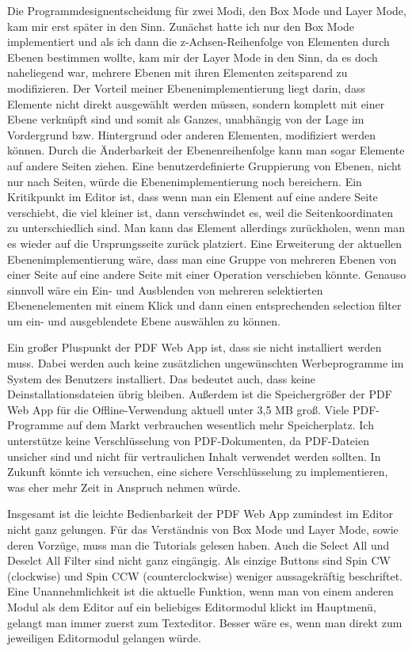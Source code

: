 \par
Die Programmdesignentscheidung für zwei Modi, den Box Mode und Layer Mode, kam mir erst später in den Sinn. Zunächst hatte ich nur den Box Mode implementiert und als ich dann die z-Achsen-Reihenfolge von Elementen durch Ebenen bestimmen wollte, kam mir der Layer Mode in den Sinn, da es doch naheliegend war, mehrere Ebenen mit ihren Elementen zeitsparend zu modifizieren. Der Vorteil meiner Ebenenimplementierung liegt darin, dass Elemente nicht direkt ausgewählt werden müssen, sondern komplett mit einer Ebene verknüpft sind und somit als Ganzes, unabhängig von der Lage im Vordergrund bzw. Hintergrund oder anderen Elementen, modifiziert werden können. Durch die Änderbarkeit der Ebenenreihenfolge kann man sogar Elemente auf andere Seiten ziehen. Eine benutzerdefinierte Gruppierung von Ebenen, nicht nur nach Seiten, würde die Ebenenimplementierung noch bereichern. Ein Kritikpunkt im Editor ist, dass wenn man ein Element auf eine andere Seite verschiebt, die viel kleiner ist, dann verschwindet es, weil die Seitenkoordinaten zu unterschiedlich sind. Man kann das Element allerdings zurückholen, wenn man es wieder auf die Ursprungsseite zurück platziert. Eine Erweiterung der aktuellen Ebenenimplementierung wäre, dass man eine Gruppe von mehreren Ebenen von einer Seite auf eine andere Seite mit einer Operation verschieben könnte. Genauso sinnvoll wäre ein Ein- und Ausblenden von mehreren selektierten Ebenenelementen mit einem Klick und dann einen entsprechenden selection filter um ein- und ausgeblendete Ebene auswählen zu können. 
\par   
Ein großer Pluspunkt der PDF Web App ist, dass sie nicht installiert werden muss. Dabei werden auch keine zusätzlichen ungewünschten Werbeprogramme im System des Benutzers installiert. Das bedeutet auch, dass keine Deinstallationsdateien übrig bleiben. Außerdem ist die Speichergrößer der PDF Web App für die Offline-Verwendung aktuell unter 3,5 MB groß. Viele PDF-Programme auf dem Markt verbrauchen wesentlich mehr Speicherplatz. Ich unterstütze keine Verschlüsselung von PDF-Dokumenten, da PDF-Dateien unsicher sind und nicht für vertraulichen Inhalt verwendet werden sollten. In Zukunft könnte ich versuchen, eine sichere Verschlüsselung zu implementieren, was eher mehr Zeit in Anspruch nehmen würde.
\par
Insgesamt ist die leichte Bedienbarkeit der PDF Web App zumindest im Editor nicht ganz gelungen. Für das Verständnis von Box Mode und Layer Mode, sowie deren Vorzüge, muss man die Tutorials gelesen haben. Auch die Select All und Deselct All Filter sind nicht ganz eingängig. Als einzige Buttons sind Spin CW (clockwise) und Spin CCW (counterclockwise) weniger aussagekräftig beschriftet. Eine Unannehmlichkeit ist die aktuelle Funktion, wenn man von einem anderen Modul als dem Editor auf ein beliebiges Editormodul klickt im Hauptmenü, gelangt man immer zuerst zum Texteditor. Besser wäre es, wenn man direkt zum jeweiligen Editormodul gelangen würde.

